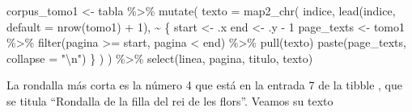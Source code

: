 \documentclass[
  letterpaper,
  DIV=11,
  numbers=noendperiod]{scrreprt}
\newenvironment{Shaded}{\begin{snugshade}}{\end{snugshade}}
\newcommand{\AttributeTok}[1]{\textcolor[rgb]{0.40,0.45,0.13}{#1}}
\newcommand{\DecValTok}[1]{\textcolor[rgb]{0.68,0.00,0.00}{#1}}
\newcommand{\FunctionTok}[1]{\textcolor[rgb]{0.28,0.35,0.67}{#1}}
\newcommand{\NormalTok}[1]{\textcolor[rgb]{0.00,0.23,0.31}{#1}}
\newcommand{\OtherTok}[1]{\textcolor[rgb]{0.00,0.23,0.31}{#1}}
\newcommand{\SpecialCharTok}[1]{\textcolor[rgb]{0.37,0.37,0.37}{#1}}
\newcommand{\StringTok}[1]{\textcolor[rgb]{0.13,0.47,0.30}{#1}}
\begin{document}
\begin{Shaded}
\begin{Highlighting}[]
\NormalTok{corpus\_tomo1 }\OtherTok{\textless{}{-}}\NormalTok{ tabla }\SpecialCharTok{\%\textgreater{}\%}
  \FunctionTok{mutate}\NormalTok{(}
    \AttributeTok{texto =} \FunctionTok{map2\_chr}\NormalTok{(}
\NormalTok{      indice,}
      \FunctionTok{lead}\NormalTok{(indice, }\AttributeTok{default =} \FunctionTok{nrow}\NormalTok{(tomo1) }\SpecialCharTok{+} \DecValTok{1}\NormalTok{),}
      \SpecialCharTok{\textasciitilde{}}\NormalTok{ \{}
\NormalTok{        start }\OtherTok{\textless{}{-}}\NormalTok{ .x}
\NormalTok{        end }\OtherTok{\textless{}{-}}\NormalTok{ .y }\SpecialCharTok{{-}} \DecValTok{1}
\NormalTok{        page\_texts }\OtherTok{\textless{}{-}}\NormalTok{ tomo1 }\SpecialCharTok{\%\textgreater{}\%}
          \FunctionTok{filter}\NormalTok{(pagina }\SpecialCharTok{\textgreater{}=}\NormalTok{ start, pagina }\SpecialCharTok{\textless{}}\NormalTok{ end) }\SpecialCharTok{\%\textgreater{}\%}
          \FunctionTok{pull}\NormalTok{(texto)}
        \FunctionTok{paste}\NormalTok{(page\_texts, }\AttributeTok{collapse =} \StringTok{"}\SpecialCharTok{\textbackslash{}n}\StringTok{"}\NormalTok{)}
\NormalTok{      \}}
\NormalTok{    )}
\NormalTok{  ) }\SpecialCharTok{\%\textgreater{}\%}
  \FunctionTok{select}\NormalTok{(linea, pagina, titulo, texto)}
\end{Highlighting}
\end{Shaded}

La rondalla más corta es la número 4 que está en la entrada 7 de la
tibble , que se titula ``Rondalla de la filla del rei de les flors''.
Veamos su texto

\begin{Shaded}
\end{Shaded}
\end{document}
